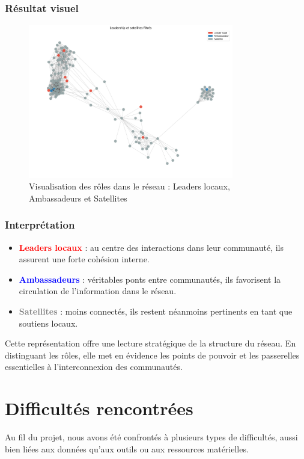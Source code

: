 \documentclass[a4paper, 12pt, twoside]{article}
\begin{document}
\subsubsection*{Résultat visuel}

\begin{figure}[H]
    \centering
    \includegraphics[width=0.8\textwidth]{smart_roles_graph_reduced_satellites.png}
    \caption{Visualisation des rôles dans le réseau : Leaders locaux, Ambassadeurs et Satellites}
    \label{fig:smart_roles}
\end{figure}

\subsubsection*{Interprétation}

\begin{itemize}
    \item \textcolor{red}{\textbf{Leaders locaux}} : au centre des interactions dans leur communauté, ils assurent une forte cohésion interne.
    \item \textcolor{blue}{\textbf{Ambassadeurs}} : véritables ponts entre communautés, ils favorisent la circulation de l’information dans le réseau.
    \item \textcolor{gray}{\textbf{Satellites}} : moins connectés, ils restent néanmoins pertinents en tant que soutiens locaux.
\end{itemize}

Cette représentation offre une lecture stratégique de la structure du réseau. En distinguant les rôles, elle met en évidence les points de pouvoir et les passerelles essentielles à l’interconnexion des communautés.


\section{Difficultés rencontrées}
Au fil du projet, nous avons été confrontés à plusieurs types de difficultés, aussi bien liées aux données qu’aux outils ou aux ressources matérielles. 
\end{document}

